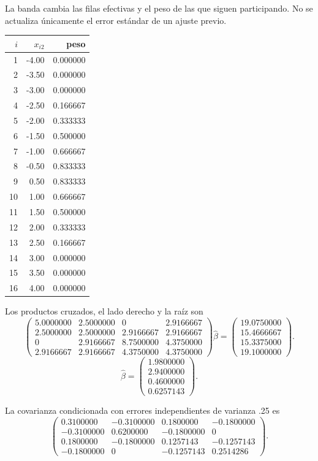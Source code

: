 \documentclass[11pt,a4paper]{article}
\begin{document}
La banda cambia las filas efectivas y
el peso de las que siguen participando.
No se actualiza únicamente el error estándar
de un ajuste previo.
\begin{center}\small\begin{tabular}{rrr}\toprule
\(i\)&\(x_{i2}\)&peso\\\midrule
1&-4.00&0.000000\\
2&-3.50&0.000000\\
3&-3.00&0.000000\\
4&-2.50&0.166667\\
5&-2.00&0.333333\\
6&-1.50&0.500000\\
7&-1.00&0.666667\\
8&-0.50&0.833333\\
9&0.50&0.833333\\
10&1.00&0.666667\\
11&1.50&0.500000\\
12&2.00&0.333333\\
13&2.50&0.166667\\
14&3.00&0.000000\\
15&3.50&0.000000\\
16&4.00&0.000000\\\bottomrule\end{tabular}\end{center}
Los productos cruzados, el lado derecho
y la raíz son
\[
\begin{pmatrix}5.0000000&2.5000000&0&2.9166667\\2.5000000&2.5000000&2.9166667&2.9166667\\0&2.9166667&8.7500000&4.3750000\\2.9166667&2.9166667&4.3750000&4.3750000\end{pmatrix}\widehat\beta=\begin{pmatrix}19.0750000\\15.4666667\\15.3375000\\19.1000000\end{pmatrix}.
\]
\[
\widehat\beta=\begin{pmatrix}1.9800000\\2.9400000\\0.4600000\\0.6257143\end{pmatrix}.
\]

La covarianza condicionada con errores
independientes de varianza .25 es
\[
\begin{pmatrix}0.3100000&-0.3100000&0.1800000&-0.1800000\\-0.3100000&0.6200000&-0.1800000&0\\0.1800000&-0.1800000&0.1257143&-0.1257143\\-0.1800000&0&-0.1257143&0.2514286\end{pmatrix}.
\]
\end{document}
